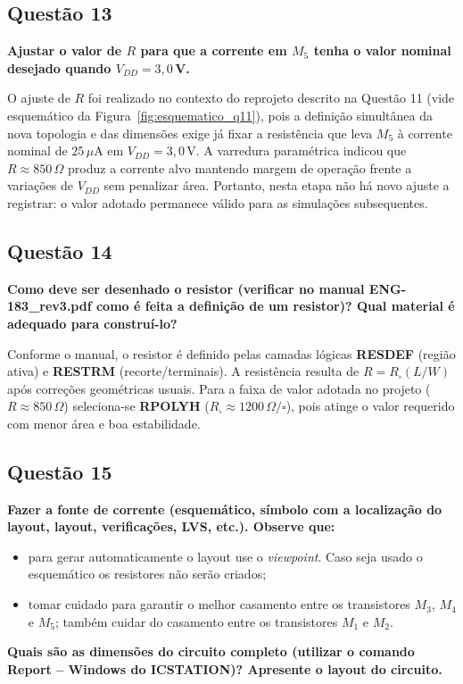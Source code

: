 \documentclass[12pt,a4paper]{article}
\begin{document}
\subsection*{Questão 13}
\begin{BoxQ}
	\textbf{Ajustar o valor de $R$ para que a corrente em $M_{5}$ tenha o valor nominal desejado quando $V_{DD} = 3{,}0$\,V.}
\end{BoxQ}

O ajuste de $R$ foi realizado no contexto do reprojeto descrito na Questão 11 (vide esquemático da Figura~\ref{fig:esquematico_q11}), pois a definição simultânea da nova topologia e das dimensões exige já fixar a resistência que leva $M_{5}$ à corrente nominal de \(25\,\mu\text{A}\) em $V_{DD}=3{,}0$\,V. A varredura paramétrica indicou que \(R \approx 850\,\Omega\) produz a corrente alvo mantendo margem de operação frente a variações de $V_{DD}$ sem penalizar área. Portanto, nesta etapa não há novo ajuste a registrar: o valor adotado permanece válido para as simulações subsequentes.

\subsection*{Questão 14}
\begin{BoxQ}
    \textbf{Como deve ser desenhado o resistor (verificar no manual ENG-183\_rev3.pdf como é feita a definição de um resistor)? Qual material é adequado para construí-lo?}
\end{BoxQ}
Conforme o manual, o resistor é definido pelas camadas lógicas \textbf{RESDEF} (região ativa) e \textbf{RESTRM} (recorte/terminais). A resistência resulta de \(R = R_{\square}(L/W)\) após correções geométricas usuais. Para a faixa de valor adotada no projeto (\(R \approx 850\,\Omega\)) seleciona-se \textbf{RPOLYH} ($R_{\square}\approx 1200\,\Omega/\square$), pois atinge o valor requerido com menor área e boa estabilidade. 

\subsection*{Questão 15}
\begin{BoxQ}
    \textbf{Fazer a fonte de corrente (esquemático, símbolo com a localização do layout, layout, verificações, LVS, etc.). Observe que:}
\begin{itemize}
    \item para gerar automaticamente o layout use o \emph{viewpoint}. Caso seja usado o esquemático os resistores não serão criados;
    \item tomar cuidado para garantir o melhor casamento entre os transistores $M_{3}$, $M_{4}$ e $M_{5}$; também cuidar do casamento entre os transistores $M_{1}$ e $M_{2}$.
\end{itemize}
    \textbf{Quais são as dimensões do circuito completo (utilizar o comando Report -- Windows do ICSTATION)? Apresente o layout do circuito.}
\end{BoxQ}
\end{document}
